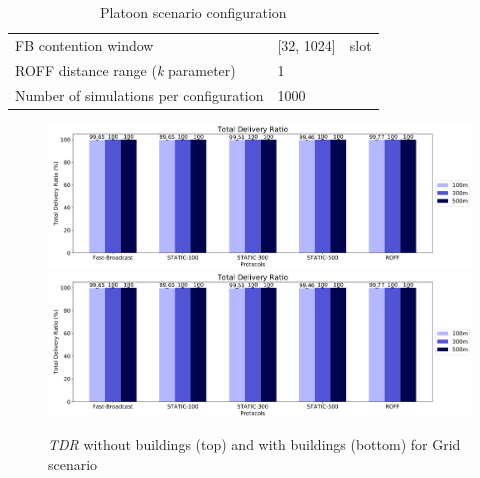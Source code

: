 \begin{table}[H]
\begin{tabularx}{\textwidth}{l | l  l}
				\midrule[1pt]
				\rowcolor{P} \multicolumn{3}{c}{Protocols configuration} \\
				\midrule[1pt]
				FB contention window					& [32, 1024]			& slot	\\
				ROFF distance range (\textit{k} parameter) & 1					&		\\	
				\midrule[1pt]
				Number of simulations per configuration	& 1000					&		\\
				\bottomrule
			\end{tabularx}
			\caption{Platoon scenario configuration}
			\label{tab:grid}
		\end{table}
	
		\begin{figure}[H]
			\centering
			\includegraphics[width=1.0\textwidth]{immagini/grid-300/b0/tdr}
			\includegraphics[width=1.0\textwidth]{immagini/grid-300/b1/tdr}
			\caption{\textit{TDR} without buildings (top) and with buildings (bottom) for Grid scenario}
			\label{fig:grid-tdr}
		\end{figure}
		
